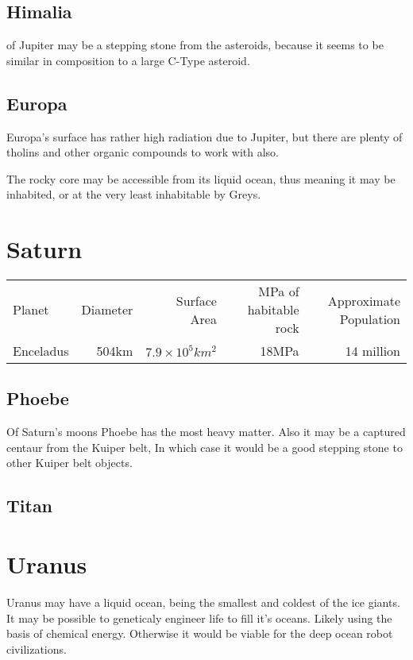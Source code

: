 \subsection{Himalia} of Jupiter may be a stepping stone from the asteroids,
because it seems to be similar in composition to a large C-Type asteroid. 

\subsection{Europa}
Europa's surface has rather high radiation due to Jupiter, but there are plenty
of tholins and other organic compounds to work with also. 

The rocky core may be accessible from its liquid ocean, thus meaning it may be
inhabited, or at the very least inhabitable by Greys. 

\section{Saturn}

\begin{tabular}{lrrrr}
  Planet & Diameter & Surface Area & MPa of habitable rock & Approximate Population\\
  Enceladus  & 504km & $7.9\times10^5km^2$ & 18MPa &  14 million\\
\end{tabular}

\subsection{Phoebe}

Of Saturn's moons Phoebe has the most heavy matter.  
Also it may be a captured centaur from the Kuiper belt, 
In which case it would be a good stepping stone to other Kuiper belt objects.

\subsection{Titan}

\section{Uranus}
Uranus may have a liquid ocean, being the smallest and coldest of the ice
giants.  It may be possible to geneticaly engineer life to fill it's oceans. 
Likely using the basis of chemical energy. Otherwise it would be viable for the
deep ocean robot civilizations. 


